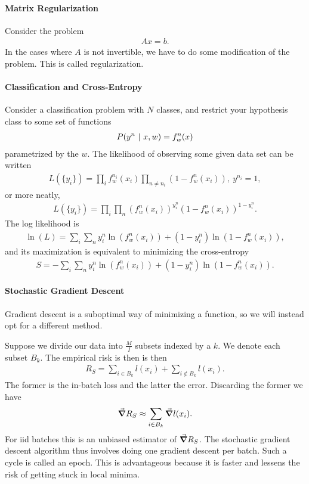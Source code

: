 \paragraph{Matrix Regularization}
Consider the problem
\begin{align*}
	Ax = b.
\end{align*}
In the cases where $A$ is not invertible, we have to do some modification of the problem. This is called regularization.

\paragraph{Classification and Cross-Entropy}
Consider a classification problem with $N$ classes, and restrict your hypothesis class to some set of functions
\begin{align*}
	P(y^{n}\ \vert\  x, w) = f_{w}^{n}(x)
\end{align*}
parametrized by the $w$. The likelihood of observing some given data set can be written
\begin{align*}
	L(\{y_{i}\}) = \prod\limits_{i}f_{w}^{n_{i}}(x_{i})\prod\limits_{n \neq n_{i}}(1 - f_{w}^{n}(x_{i})),\ y^{n_{i}} = 1,
\end{align*}
or more neatly,
\begin{align*}
	L(\{y_{i}\}) = \prod\limits_{i}\prod\limits_{n}(f_{w}^{n}(x_{i}))^{y_{i}^{n}}(1 - f_{w}^{n}(x_{i}))^{1 - y_{i}^{n}}.
\end{align*}
The log likelihood is
\begin{align*}
	\ln(L) = \sum\limits_{i}\sum\limits_{n}y_{i}^{n}\ln(f_{w}^{n}(x_{i})) + (1 - y_{i}^{n})\ln(1 - f_{w}^{n}(x_{i})),
\end{align*}
and its maximization is equivalent to minimizing the cross-entropy
\begin{align*}
	S = -\sum\limits_{i}\sum\limits_{n}y_{i}^{n}\ln(f_{w}^{n}(x_{i})) + (1 - y_{i}^{n})\ln(1 - f_{w}^{n}(x_{i})).
\end{align*}

\paragraph{Stochastic Gradient Descent}
Gradient descent is a suboptimal way of minimizing a function, so we will instead opt for a different method.

Suppose we divide our data into $\frac{M}{I}$ subsets indexed by a $k$. We denote each subset $B_{k}$. The empirical risk is then is then
\begin{align*}
	R_{S} = \sum\limits_{i\in B_{k}}l(x_{i}) + \sum\limits_{i\notin B_{k}}l(x_{i}).
\end{align*}
The former is the in-batch loss and the latter the error. Discarding the former we have
\begin{align*}
	\grad R_{S} \approx \sum\limits_{i\in B_{k}}\grad l(x_{i}).
\end{align*}
For iid batches this is an unbiased estimator of $\grad R_{S}$. The stochastic gradient descent algorithm thus involves doing one gradient descent per batch. Such a cycle is called an epoch. This is advantageous because it is faster and lessens the risk of getting stuck in local minima.